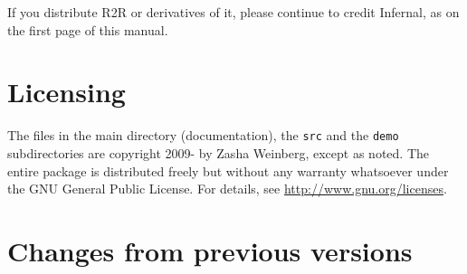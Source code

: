 \documentclass[letterpaper,12pt]{report}
\begin{document}
If you distribute R2R or derivatives of it, please continue to credit Infernal, as on the first page of this manual.

\section{Licensing}

The files in the main directory (documentation), the {\tt src} and the {\tt demo}
subdirectories are copyright 2009-\the\year{} by 
Zasha Weinberg, except as noted.  The entire package is distributed freely but without any warranty whatsoever
under the GNU General Public License.
For details, see \url{http://www.gnu.org/licenses}.

\section{Changes from previous versions}
\end{document}
